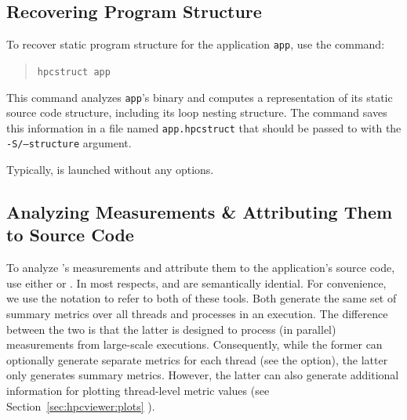 \documentclass[11pt,letterpaper]{report}
\begin{document}

\subsection{Recovering Program Structure}

To recover static program structure for the application \texttt{app}, use the command:
\begin{quote}
  \verb|hpcstruct app|
\end{quote}
This command analyzes \texttt{app}'s binary and computes a representation of its static source code structure, including its loop nesting structure.
The command saves this information in a file named \texttt{app.hpcstruct} that should be passed to \hpcprof{} with the \texttt{-S/--structure} argument.

Typically, \hpcstruct{} is launched without any options.



\subsection{Analyzing Measurements \& Attributing Them to Source Code}

To analyze \HPCToolkit{}'s measurements and attribute them to the application's source code, use either \hpcprof{} or \hpcprofmpi{}.
In most respects, \hpcprof{} and \hpcprofmpi{} are semantically idential. For convenience, we use the notation \hpcprofAll{} to refer to both of these tools.
Both generate the same set of summary metrics over all threads and processes in an execution.
The difference between the two is that the latter is designed to process (in parallel) measurements from large-scale executions.
Consequently, while the former can optionally generate separate metrics for each thread (see the  option), the latter only generates summary metrics.
However, the latter can also generate additional information for plotting thread-level metric values (see Section~\ref{sec:hpcviewer:plots}%
).
\end{document}
